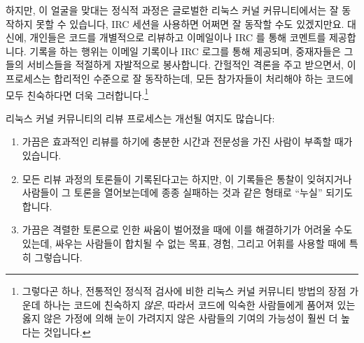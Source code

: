 하지만, 이 얼굴을 맞대는 정식적 과정은 글로벌한 리눅스 커널 커뮤니티에서는 잘
동작하지 못할 수 있습니다, IRC 세션을 사용하면 어쩌면 잘 동작할 수도
있겠지만요.
대신에, 개인들은 코드를 개별적으로 리뷰하고 이메일이나 IRC 를 통해 코멘트를
제공합니다.
기록을 하는 행위는 이메일 기록이나 IRC 로그를 통해 제공되며, 중재자들은 그들의
서비스들을 적절하게 자발적으로 봉사합니다.
간헐적인 격론을 주고 받으면서, 이 프로세스는 합리적인 수준으로 잘 동작하는데,
모든 참가자들이 처리해야 하는 코드에 모두 친숙하다면 더욱 그러합니다.\footnote{
	그렇다곤 하나, 전통적인 정식적 검사에 비한 리눅스 커널 커뮤니티 방법의
	장점 가운데 하나는 코드에 친숙하지 \emph{않은}, 따라서 코드에 익숙한
	사람들에게 품어져 있는 옳지 않은 가정에 의해 눈이 가려지지 않은
	사람들의 기여의 가능성이 훨씬 더 높다는 것입니다.}

리눅스 커널 커뮤니티의 리뷰 프로세스는 개선될 여지도 많습니다:

\begin{enumerate}
\item	가끔은 효과적인 리뷰를 하기에 충분한 시간과 전문성을 가진 사람이 부족할
	때가 있습니다.
\item	모든 리뷰 과정의 토론들이 기록된다고는 하지만, 이 기록들은 통찰이
	잊혀지거나 사람들이 그 토론을 열어보는데에 종종 실패하는 것과 같은
	형태로 ``누실'' 되기도 합니다.
\item	가끔은 격렬한 토론으로 인한 싸움이 벌어졌을 때에 이를 해결하기가 어려울
	수도 있는데, 싸우는 사람들이 합치될 수 없는 목표, 경험, 그리고 어휘를
	사용할 때에 특히 그렇습니다.

\end{enumerate}


